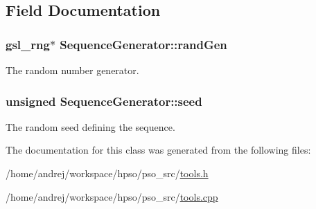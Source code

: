 \subsection{Field Documentation}
\hypertarget{classSequenceGenerator_d6033e82add37b0274c09f12ceb52b46}{
\subsubsection{\setlength{\rightskip}{0pt plus 5cm}gsl\_\-rng$\ast$ {\bf SequenceGenerator::randGen}}}
\label{classSequenceGenerator_d6033e82add37b0274c09f12ceb52b46}


The random number generator. 

\hypertarget{classSequenceGenerator_85f49d98c11df6ec9647eada74178a32}{
\subsubsection{\setlength{\rightskip}{0pt plus 5cm}unsigned {\bf SequenceGenerator::seed}}}
\label{classSequenceGenerator_85f49d98c11df6ec9647eada74178a32}


The random seed defining the sequence. 



The documentation for this class was generated from the following files:\begin{CompactItemize}
\item 
/home/andrej/workspace/hpso/pso\_\-src/\hyperlink{tools_8h}{tools.h}\item 
/home/andrej/workspace/hpso/pso\_\-src/\hyperlink{tools_8cpp}{tools.cpp}\end{CompactItemize}

